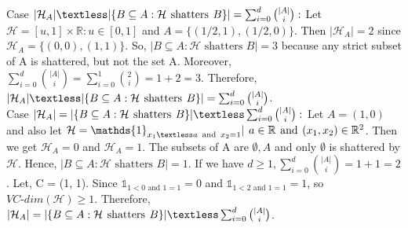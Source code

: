 \documentclass[12pt,letterpaper]{article}
\begin{document}
\begin{enumerate}
Case $|\mathcal{H}_A| \textless |\{B \subseteq A : \mathcal{H}\hspace{4pt} \text{shatters}\hspace{4pt} B\}| = \sum_{i=0}^d {|A| \choose i}:$ Let $\mathcal{H} = {[u, 1] \times \mathbb{R} : u\in[0,1]}$ and $A = \{(1/2, 1), (1/2, 0)\}$. 
Then $|\mathcal{H}_A| = 2$ since $\mathcal{H}_A = \{(0, 0), (1, 1)\}$. So, $|B \subseteq A : \mathcal{H}\hspace{4pt} \text{shatters}\hspace{4pt} B| = 3$ because any strict subset of A is shattered, but not the set A. Moreover, $\sum_{i=0}^d {|A|\choose i} = \sum_{i=0}^1{2\choose i} = 1 + 2 = 3$.
Therefore, $|\mathcal{H}_A| \textless |\{B \subseteq A : \mathcal{H}\hspace{4pt} \text{shatters}\hspace{4pt} B\}| = \sum_{i=0}^d {|A| \choose i}$. \\

Case $|\mathcal{H}_A| = |\{B \subseteq A : \mathcal{H}\hspace{4pt} \text{shatters}\hspace{4pt} B\}| \textless \sum_{i=0}^d {|A| \choose i}:$ Let $A = {(1, 0)}$ and also let $\mathcal{H} = \mathds{1}_{x_1\textless a\hspace{4pt}\text{and}\hspace{4pt} x_2 = 1} | \hspace{4pt}a\in\mathbb{R} \hspace{4pt}\text{and} \hspace{4pt} (x_1, x_2)\in\mathbb{R}^2$. Then we get $\mathcal{H}_A = 0$ and $\mathcal{H}_A = 1$. The subsets of A are ${\emptyset, A}$ and only $\emptyset$ is shattered by $\mathcal{H}$. Hence, $|B \subseteq A : \mathcal{H}\hspace{4pt} \text{shatters}\hspace{4pt} B| = 1$. If we have $d \ge 1, \sum_{i=0}^d {|A| \choose i} = 1 + 1 = 2$. Let, C = {(1, 1)}. Since $\mathds{1}_{1<0 \hspace{4pt}\text{and}\hspace{4pt} 1=1} = 0$ and $\mathds{1}_{1<2\hspace{4pt} \text{and}\hspace{4pt} 1=1} = 1$, so $VC\text{-}dim(\mathcal{H}) \ge 1$. Therefore, $|\mathcal{H}_A| = |\{B \subseteq A : \mathcal{H}\hspace{4pt} \text{shatters}\hspace{4pt} B\}| \textless \sum_{i=0}^d {|A| \choose i}$. \\



\end{enumerate}
\end{document}
